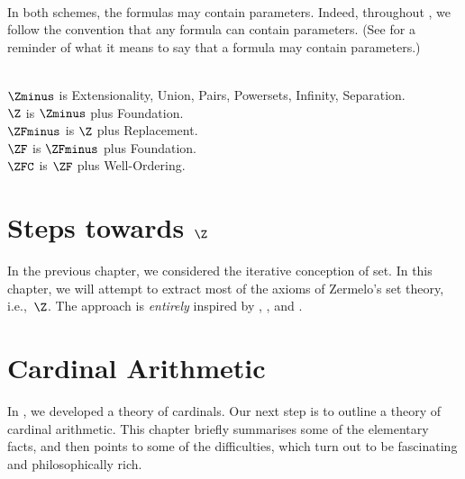 \
\\In both schemes, the formulas may contain parameters. Indeed, throughout , we follow the convention that any formula can contain parameters. (See  for a reminder of what it means to say that a formula may contain parameters.)

\
\\$\Zminus$ is Extensionality, Union, Pairs, Powersets, Infinity, Separation.
\\$\Z$ is $\Zminus$ plus Foundation.
\\$\ZFminus$ is $\Z$ plus Replacement.
\\$\ZF$ is $\ZFminus$ plus Foundation.
\\$\ZFC$ is $\ZF$ plus Well-Ordering.


\chapter{Steps towards $\Z$}

In the previous chapter, we considered the iterative conception of
set. In this chapter, we will attempt to extract most of the axioms of
Zermelo's set theory, i.e.,~$\Z$. The approach is \emph{entirely}
inspired by \citet{Boolos1971},  \citet{Scott1974}, and
\citet{Shoenfield:AST}. 

\olresetchapter






\chapter{Cardinal Arithmetic}

In , we developed a theory of cardinals.
Our next step is to outline a theory of cardinal arithmetic. This
chapter briefly summarises some of the elementary facts, and then
points to some of the difficulties, which turn out to be fascinating
and philosophically rich.

\olresetchapter


